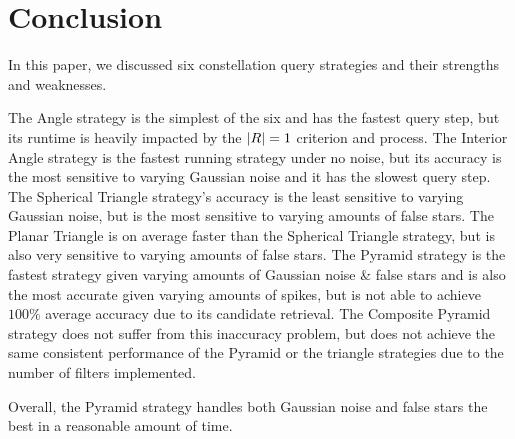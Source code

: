 \section{Conclusion}\label{sec:conclusion}
In this paper, we discussed six constellation query strategies and their strengths and weaknesses.

The Angle strategy is the simplest of the six and has the fastest query step, but its runtime is heavily impacted by the $\left| R \right| = 1$ criterion and  process.
The Interior Angle strategy is the fastest running strategy under no noise, but its accuracy is the most sensitive to varying Gaussian noise and it has the slowest query step.
The Spherical Triangle strategy's accuracy is the least sensitive to varying Gaussian noise, but is the most sensitive to varying amounts of false stars.
The Planar Triangle is on average faster than the Spherical Triangle strategy, but is also very sensitive to varying amounts of false stars.
The Pyramid strategy is the fastest strategy given varying amounts of Gaussian noise \& false stars and is also the most accurate given varying amounts of spikes, but is not able to achieve $100\%$ average accuracy due to its candidate retrieval.
The Composite Pyramid strategy does not suffer from this inaccuracy problem, but does not achieve the same consistent performance of the Pyramid or the triangle strategies due to the number of filters implemented.

Overall, the Pyramid strategy handles both Gaussian noise and false stars the best in a reasonable amount of time.
